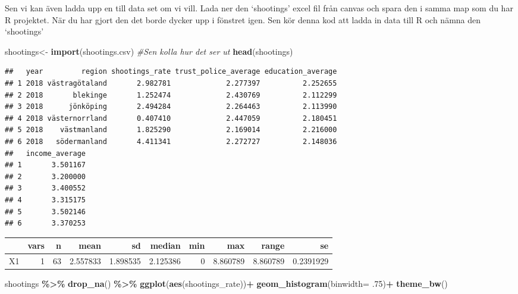 \documentclass[
]{book}
\newenvironment{Shaded}{\begin{snugshade}}{\end{snugshade}}
\newcommand{\AttributeTok}[1]{\textcolor[rgb]{0.13,0.29,0.53}{#1}}
\newcommand{\CommentTok}[1]{\textcolor[rgb]{0.56,0.35,0.01}{\textit{#1}}}
\newcommand{\ConstantTok}[1]{\textcolor[rgb]{0.56,0.35,0.01}{#1}}
\newcommand{\DecValTok}[1]{\textcolor[rgb]{0.00,0.00,0.81}{#1}}
\newcommand{\FunctionTok}[1]{\textcolor[rgb]{0.13,0.29,0.53}{\textbf{#1}}}
\newcommand{\NormalTok}[1]{#1}
\newcommand{\OtherTok}[1]{\textcolor[rgb]{0.56,0.35,0.01}{#1}}
\newcommand{\SpecialCharTok}[1]{\textcolor[rgb]{0.81,0.36,0.00}{\textbf{#1}}}
\newcommand{\StringTok}[1]{\textcolor[rgb]{0.31,0.60,0.02}{#1}}
\begin{document}
Sen vi kan även ladda upp en till data set om vi vill. Lada ner den `shootings'
excel fil från canvas och spara den i samma map som du har R projektet. När du har gjort den det borde dycker upp i fönstret igen. Sen kör denna kod att ladda in data till R och nämna den
`shootings'

\begin{Shaded}
\begin{Highlighting}[]
\NormalTok{shootings}\OtherTok{\textless{}{-}} \FunctionTok{import}\NormalTok{(}\StringTok{\textquotesingle{}shootings.csv\textquotesingle{}}\NormalTok{)}
\CommentTok{\#Sen kolla hur det ser ut}
\FunctionTok{head}\NormalTok{(shootings)}
\end{Highlighting}
\end{Shaded}

\begin{verbatim}
##   year         region shootings_rate trust_police_average education_average
## 1 2018 västragötaland       2.982781             2.277397          2.252655
## 2 2018       blekinge       1.252474             2.430769          2.112299
## 3 2018      jönköping       2.494284             2.264463          2.113990
## 4 2018 västernorrland       0.407410             2.447059          2.180451
## 5 2018    västmanland       1.825290             2.169014          2.216000
## 6 2018   södermanland       4.411341             2.272727          2.148036
##   income_average
## 1       3.501167
## 2       3.200000
## 3       3.400552
## 4       3.315175
## 5       3.502146
## 6       3.370253
\end{verbatim}

\begin{Shaded}
\end{Shaded}

\begin{tabular}{l|r|r|r|r|r|r|r|r|r}
\hline
  & vars & n & mean & sd & median & min & max & range & se\\
\hline
X1 & 1 & 63 & 2.557833 & 1.898535 & 2.125386 & 0 & 8.860789 & 8.860789 & 0.2391929\\
\hline
\end{tabular}

\begin{Shaded}
\begin{Highlighting}[]
\NormalTok{shootings }\SpecialCharTok{\%\textgreater{}\%} \FunctionTok{drop\_na}\NormalTok{() }\SpecialCharTok{\%\textgreater{}\%} 
  \FunctionTok{ggplot}\NormalTok{(}\FunctionTok{aes}\NormalTok{(shootings\_rate))}\SpecialCharTok{+} \FunctionTok{geom\_histogram}\NormalTok{(}\AttributeTok{binwidth=}\NormalTok{ .}\DecValTok{75}\NormalTok{)}\SpecialCharTok{+}
   \FunctionTok{theme\_bw}\NormalTok{()}
\end{Highlighting}
\end{Shaded}
\end{document}
